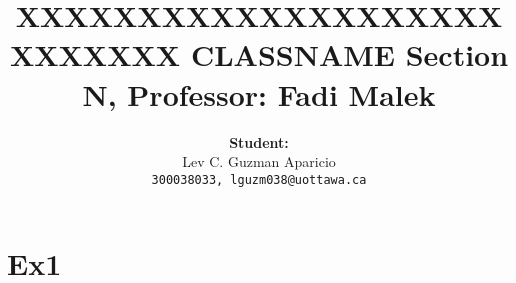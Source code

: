 \documentclass[14pt, lettersize]{extarticle}
\title{XXXXXXXXXXXXXXXXXXXXXXXXXXX \newline \newline
	  \large \textbf{ CLASSNAME Section N, Professor: Fadi Malek} }
\author{\Large \textbf{Student:} \\ Lev C. Guzman Aparicio \\ 
		\texttt{300038033, lguzm038@uottawa.ca}}
\begin{document}
	\maketitle
	
	\section{Ex1}
	
\end{document}
